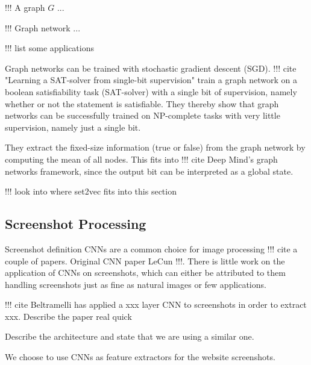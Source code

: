 !!! A graph $G$ ...

!!! Graph network ...

!!! list some applications

Graph networks can be trained with stochastic gradient descent (SGD). !!! cite "Learning a SAT-solver from single-bit supervision" train a graph network on a boolean satisfiability task (SAT-solver) with a single bit of supervision, namely whether or not the statement is satisfiable. They thereby show that graph networks can be successfully trained on NP-complete tasks with very little supervision, namely just a single bit.

They extract the fixed-size information (true or false) from the graph network by computing the mean of all nodes. This fits into !!! cite Deep Mind's graph networks framework, since the output bit can be interpreted as a global state.

!!! look into where set2vec fits into this section


\subsection{Screenshot Processing}

Screenshot definition
CNNs are a common choice for image processing !!! cite a couple of papers. Original CNN paper LeCun !!!. There is little work on the application of CNNs on screenshots, which can either be attributed to them handling screenshots just as fine as natural images or few applications.

!!! cite Beltramelli has applied a xxx layer CNN to screenshots in order to extract xxx. Describe the paper real quick

Describe the architecture and state that we are using a similar one.

We choose to use CNNs as feature extractors for the website screenshots.

